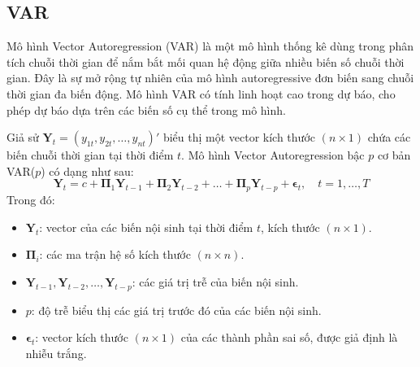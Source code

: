 \subsection{VAR}
Mô hình Vector Autoregression (VAR) là một mô hình thống kê dùng trong phân tích chuỗi thời gian để nắm bắt mối quan hệ động giữa nhiều biến số chuỗi thời gian. Đây là sự mở rộng tự nhiên của mô hình autoregressive đơn biến sang chuỗi thời gian đa biến động. Mô hình VAR có tính linh hoạt cao trong dự báo, cho phép dự báo dựa trên các biến số cụ thể trong mô hình.

Giả sử $\mathbf{Y}_t=(y_{1t},y_{2t},\ldots,y_{nt})'$ biểu thị một vector kích thước $(n \times 1)$ chứa các biến chuỗi thời gian tại thời điểm $t$. Mô hình Vector Autoregression bậc $p$ cơ bản VAR($p$) có dạng như sau:
\[
\mathbf{Y}_t = c + \mathbf{\Pi}_1 \mathbf{Y}_{t-1} + \mathbf{\Pi}_2 \mathbf{Y}_{t-2} + \ldots + \mathbf{\Pi}_p \mathbf{Y}_{t-p} + \mathbf{\epsilon}_t, \quad t=1,\ldots,T
\]
Trong đó:
\begin{itemize}
    \item $\mathbf{Y}_t$: vector của các biến nội sinh tại thời điểm $t$, kích thước $(n \times 1)$. 
    \item $\mathbf{\Pi}_i$: các ma trận hệ số kích thước $(n \times n)$.
    \item $\mathbf{Y}_{t-1}, \mathbf{Y}_{t-2}, \ldots, \mathbf{Y}_{t-p}$: các giá trị trễ của biến nội sinh.
    \item $p$: độ trễ biểu thị các giá trị trước đó của các biến nội sinh.
    \item $\mathbf{\epsilon}_t$: vector kích thước $(n \times 1)$ của các thành phần sai số, được giả định là nhiễu trắng.
\end{itemize}

